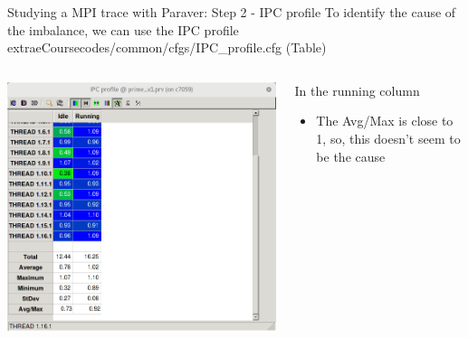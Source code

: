 \documentclass[10pt,xcolor=table]{beamer}
\begin{document}
\begin{frame}{Studying a MPI trace with Paraver: Step 2 - IPC profile}
To identify the cause of the imbalance, we can use the IPC profile extraeCoursecodes/common/cfgs/IPC\_profile.cfg (Table)

\begin{columns}
\begin{column}{0.5\textwidth}
  \includegraphics[width=\textwidth]{figs/ipc_profile_table.png}
\end{column}
\begin{column}{0.5\textwidth}
In the running column
  \begin{itemize}
      \item The Avg/Max is close to 1, so, this doesn't seem to be the cause
  \end{itemize}
\end{column}
\end{columns}
\end{frame}
\end{document}
